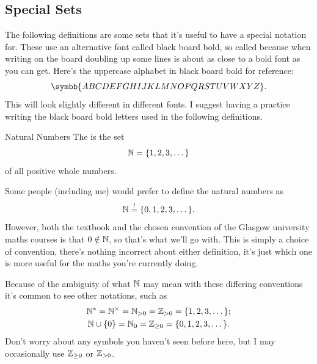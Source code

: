 \documentclass[fleqn]{LectureClass/LectureClass}
\begin{document}
    \subsection{Special Sets}
    The following definitions are some sets that it's useful to have a special notation for.
    These use an alternative font called black board bold, so called because when writing on the board doubling up some lines is about as close to a bold font as you can get.
    Here's the uppercase alphabet in black board bold for reference:
    \begin{equation}
        \symbb{ABCDEFGHIJKLMNOPQRSTUVWXYZ}.
    \end{equation}
    This will look slightly different in different fonts.
    I suggest having a practice writing the black board bold letters used in the following definitions.
    
    \begin{dfn}{Natural Numbers}{}
        The  is the set
        \begin{equation}
            \mathbb{N} = \{1, 2, 3, \dotsc\}
        \end{equation}
        of all positive whole numbers.
    \end{dfn}
    \begin{remark}{}{}
        Some people (including me) would prefer to define the natural numbers as
        \begin{equation}
            \mathbb{N} \stackrel{!}{=} \{0, 1, 2, 3, \dotsc\}.
        \end{equation}
        However, both the textbook and the chosen convention of the Glasgow university maths courses is that \(0 \notin \mathbb{N}\), so that's what we'll go with.
        This is simply a choice of convention, there's nothing incorrect about either definition, it's just which one is more useful for the maths you're currently doing.
        
        Because of the ambiguity of what \(\mathbb{N}\) may mean with these differing conventions it's common to see other notations, such as
        \begin{gather}
            \mathbb{N}^{*} = \mathbb{N}^{\times} = \mathbb{N}_{>0} = \mathbb{Z}_{>0} = \{1, 2, 3, \dotsc\};\\
            \mathbb{N} \cup \{0\} = \mathbb{N}_0 = \mathbb{Z}_{\ge 0} = \{0, 1, 2, 3, \dotsc\}.
        \end{gather}
        Don't worry about any symbols you haven't seen before here, but I may occasionally use \(\mathbb{Z}_{\ge 0}\) or \(\mathbb{Z}_{>0}\).
    \end{remark}
    
\end{document}
